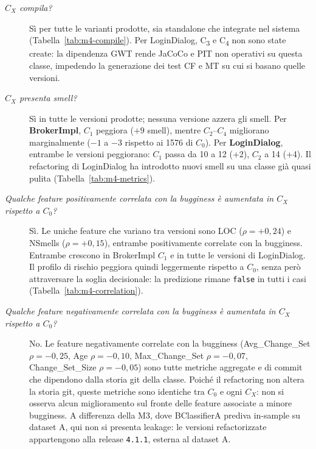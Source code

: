 \begin{description}
  \item[\textit{$C_X$ compila?}]
  Sì per tutte le varianti prodotte, sia standalone che integrate nel sistema
  (Tabella~\ref{tab:m4-compile}). Per LoginDialog, C\textsubscript{3} e
  C\textsubscript{4} non sono state create: la dipendenza GWT rende JaCoCo e PIT
  non operativi su questa classe, impedendo la generazione dei test CF e MT su cui
  si basano quelle versioni.

  \item[\textit{$C_X$ presenta smell?}]
  Sì in tutte le versioni prodotte; nessuna versione azzera gli smell.
  Per \textbf{BrokerImpl}, $C_1$ peggiora ($+9$ smell), mentre $C_2$--$C_4$ migliorano
  marginalmente ($-1$ a $-3$ rispetto ai 1576 di $C_0$).
  Per \textbf{LoginDialog}, entrambe le versioni peggiorano: $C_1$ passa da 10 a 12
  (+2), $C_2$ a 14 (+4). Il refactoring di LoginDialog ha introdotto nuovi smell su
  una classe già quasi pulita (Tabella~\ref{tab:m4-metrics}).

  \item[\textit{Qualche feature positivamente correlata con la bugginess è aumentata in $C_X$ rispetto a $C_0$?}]
  Sì. Le uniche feature che variano tra versioni sono LOC ($\rho = +0{,}24$) e NSmells
  ($\rho = +0{,}15$), entrambe positivamente correlate con la bugginess.
  Entrambe crescono in BrokerImpl $C_1$ e in tutte le versioni di LoginDialog.
  Il profilo di rischio peggiora quindi leggermente rispetto a $C_0$, senza però
  attraversare la soglia decisionale: la predizione rimane \texttt{false} in tutti i casi
  (Tabella~\ref{tab:m4-correlation}).

  \item[\textit{Qualche feature negativamente correlata con la bugginess è aumentata in $C_X$ rispetto a $C_0$?}]
  No. Le feature negativamente correlate con la bugginess (Avg\_Change\_Set
  $\rho = -0{,}25$, Age $\rho = -0{,}10$, Max\_Change\_Set $\rho = -0{,}07$,
  Change\_Set\_Size $\rho = -0{,}05$) sono tutte metriche aggregate e di commit che dipendono
  dalla storia git della classe. Poiché il refactoring non altera la storia git, queste
  metriche sono identiche tra $C_0$ e ogni $C_X$: non si osserva alcun miglioramento
  sul fronte delle feature associate a minore bugginess.
  A differenza della M3, dove BClassifierA prediva in-sample su dataset A,
  qui non si presenta leakage: le versioni refactorizzate appartengono alla release
  \texttt{4.1.1}, esterna al dataset A.
\end{description}

